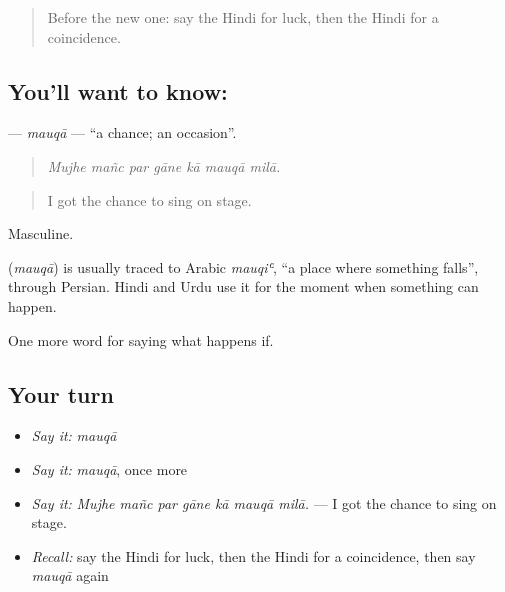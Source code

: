 \label{lesson:HI-C544-mauqa}



\begin{quote}
Before the new one: say the Hindi for luck, then the Hindi for a coincidence.
\end{quote}

\subsection*{You'll want to know: }
\textbf{} — \emph{mauqā} — \textquotedblleft{}a chance; an occasion\textquotedblright{}.

\begin{quote}
      
\end{quote}

\begin{quote}
\emph{Mujhe mañc par gāne kā mauqā milā.}
\end{quote}

\begin{quote}
I got the chance to sing on stage.
\end{quote}

Masculine.

\begin{cousinweb}
\textbf{} (\emph{mauqā}) is usually traced to Arabic \emph{mauqiʿ}, \textquotedblleft{}a place where something falls\textquotedblright{}, through Persian. Hindi and Urdu use it for the moment when something can happen.
\end{cousinweb}

\begin{grammarlens}[title={What you've built}]
One more word for saying what happens if.
\end{grammarlens}

\subsection*{Your turn}
\begin{itemize}
\raggedright
  \item \emph{Say it:} \emph{mauqā}
  \item \emph{Say it:} \emph{mauqā}, once more
  \item \emph{Say it:} \emph{Mujhe mañc par gāne kā mauqā milā.} — I got the chance to sing on stage.
  \item \emph{Recall:} say the Hindi for luck, then the Hindi for a coincidence, then say \emph{mauqā} again
\end{itemize}


